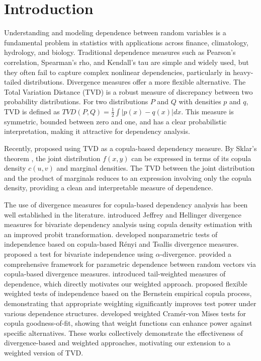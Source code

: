 \documentclass[twoside]{article}
\begin{document}
\section{Introduction}

Understanding and modeling dependence between random variables is a fundamental problem in statistics with applications across finance, climatology, hydrology, and biology. Traditional dependence measures such as Pearson's correlation, Spearman's rho, and Kendall's tau are simple and widely used, but they often fail to capture complex nonlinear dependencies, particularly in heavy-tailed distributions. Divergence measures offer a more flexible alternative. The Total Variation Distance (TVD) is a robust measure of discrepancy between two probability distributions. For two distributions \( P \) and \( Q \) with densities \( p \) and \( q \), TVD is defined as \( TVD(P,Q) = \frac{1}{2} \int |p(x) - q(x)| dx \). This measure is symmetric, bounded between zero and one, and has a clear probabilistic interpretation, making it attractive for dependency analysis.

Recently, \cite{mohammadi2025copula} proposed using TVD as a copula-based dependency measure. By Sklar's theorem \cite{sklar1959fonctions}, the joint distribution \( f(x,y) \) can be expressed in terms of its copula density \( c(u,v) \) and marginal densities. The TVD between the joint distribution and the product of marginals reduces to an expression involving only the copula density, providing a clean and interpretable measure of dependence.

The use of divergence measures for copula-based dependency analysis has been well established in the literature. \cite{mohammadi2021bivariate} introduced Jeffrey and Hellinger divergence measures for bivariate dependency analysis using copula density estimation with an improved probit transformation. \cite{mohammadi2023nonparametric} developed nonparametric tests of independence based on copula-based R\'enyi and Tsallis divergence measures. \cite{mohammadi2024testing} proposed a test for bivariate independence using \( \alpha \)-divergence. \cite{DeKeyser2024} provided a comprehensive framework for parametric dependence between random vectors via copula-based divergence measures. \cite{Krupskii2015} introduced tail-weighted measures of dependence, which directly motivates our weighted approach. \cite{Hudaverdi2020} proposed flexible weighted tests of independence based on the Bernstein empirical copula process, demonstrating that appropriate weighting significantly improves test power under various dependence structures. \cite{Bucher2011} developed weighted Cram\'er-von Mises tests for copula goodness-of-fit, showing that weight functions can enhance power against specific alternatives. These works collectively demonstrate the effectiveness of divergence-based and weighted approaches, motivating our extension to a weighted version of TVD.
\end{document}
